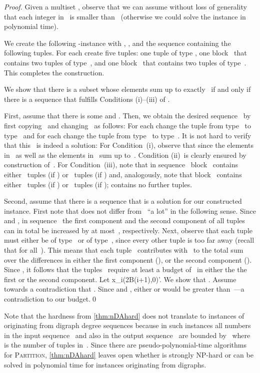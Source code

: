 \documentclass[a4paper,11pt]{article}
\theoremstyle{remark}
\theoremstyle{plain}
\theoremstyle{definition}
\begin{document}
\begin{proof}
	Given a multiset , observe that we can assume without loss of generality that each integer in~ is smaller than~ (otherwise we could solve the instance in polynomial time).
 
	We create the following \nDA-instance with , , and the sequence  containing the following tuples.
	For each  create five tuples: one tuple  of type , one block~ that contains two tuples of type~, and one block~ that contains two tuples of type~.
	This completes the construction.
 
	We show that there is a subset  whose elements sum up to exactly~ if and only if there is a sequence  that fulfills Conditions (i)--(iii) of \nDA.
 
	First, assume that there is some  and .
	Then, we obtain the desired sequence~ by first copying~ and changing~ as follows:
	For each  change the tuple  from type~ to type~ and for each  change the tuple  from type~ to type~.
	It is not hard to verify that this~ is indeed a solution:
	For Condition~(i), observe that  since the elements in~ as well as the elements in~ sum up to~.
	Condition (ii)~is clearly ensured by construction of~.
	For Condition~(iii), note that in sequence~ block~ contains either ~tuples (if ) or ~tuples (if ) and, analogously, note that block~ contains either ~tuples (if ) or ~tuples (if );  contains no further tuples.
	
	Second, assume that there is a sequence  that is a solution for our constructed \nDA instance.
	First note that  does not differ from~ ``a lot'' in the following sense.
	Since  and , in sequence~ the first component and the second component of all tuples can in total be increased by at most~, respectively.
	Next, observe that each tuple~ must either be of type~ or of type~, since  every other tuple is too far away (recall that  for all~).
	This means that each tuple~ contributes with~ to the total sum over the differences in either the first component (), or the second component ().
	Since , it follows that the tuples~ require at least a budget of~ in either the the first or the second component. 
	Let x_i(2B(i+1),0)\sigma'.
	We show that .
	Assume towards a contradiction that .
	Since  and , either  or  would be greater than~---a contradiction to our budget.\qed
\end{proof}

Note that the hardness from \cref{thm:nDAhard} does not translate to instances of \nDA originating from digraph degree sequences because in such instances all numbers in the input sequence~ and also in the output sequence~ are bounded by~ where~ is the number of tuples in~.
Since there are pseudo-polynomial-time algorithms for \textsc{Partition}, \cref{thm:nDAhard} leaves open whether \nDA is  strongly NP-hard or can be solved in polynomial time for instances originating from digraphs.
\end{document}
